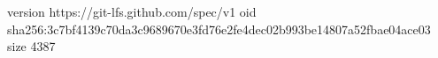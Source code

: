 version https://git-lfs.github.com/spec/v1
oid sha256:3c7bf4139c70da3c9689670e3fd76e2fe4dec02b993be14807a52fbae04ace03
size 4387
